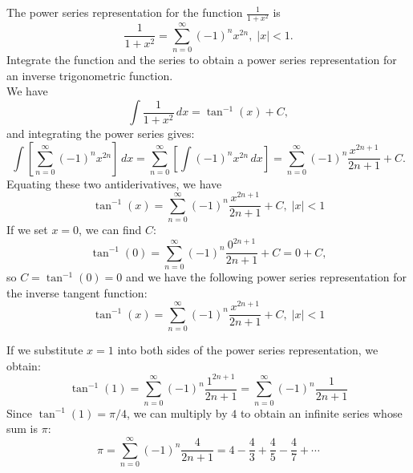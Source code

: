 \documentclass[handout]{ximera}
\begin{document}
\begin{example}[example 3]
The power series representation for the function $\frac{1}{1+x^2}$ is 
\[
\frac{1}{1+x^2} = \sum_{n=0}^\infty (-1)^n x^{2n}, \; |x| < 1.
\]
Integrate the function and the series to obtain a power series representation for an inverse trigonometric function.\\
We have
\[
\int \frac{1}{1+x^2} \, dx = \tan^{-1}(x) + C,
\]
and integrating the power series gives:
\[
\int \left[\sum_{n=0}^\infty (-1)^n x^{2n} \right] \, dx =  \sum_{n=0}^\infty \left[ \int(-1)^n x^{2n} \, dx \right] = \sum_{n=0}^\infty  (-1)^n \frac{x^{2n+1}}{2n+1} +C.
\]
Equating these two antiderivatives, we have
\[
\tan^{-1}(x) = \sum_{n=0}^\infty  (-1)^n \frac{x^{2n+1}}{2n+1} +C, \; |x| < 1
\]
If we set $x = 0$, we can find $C$:
\[
\tan^{-1}(0) = \sum_{n=0}^\infty  (-1)^n \frac{0^{2n+1}}{2n+1} +C = 0 + C,
\]
so $C = \tan^{-1}(0) = 0$ and we have the following power series representation for the inverse tangent function:
\[
\tan^{-1}(x) = \sum_{n=0}^\infty  (-1)^n \frac{x^{2n+1}}{2n+1} +C, \; |x| < 1
\]
\begin{remark}[Remark]
If we substitute $x = 1$ into both sides of the power series representation, we obtain:
\[
\tan^{-1}(1) = \sum_{n=0}^\infty  (-1)^n \frac{1^{2n+1}}{2n+1} = \sum_{n=0}^\infty  (-1)^n \frac{1}{2n+1} 
\]
Since $\tan^{-1}(1) = \pi/4$, we can multiply by $4$ to obtain an infinite series whose sum is $\pi$:
\[
\pi = \sum_{n=0}^\infty  (-1)^n \frac{4}{2n+1} = 4 - \frac43 + \frac45 - \frac47 + \cdots
\]
\end{remark}




\end{example}
\end{document}
